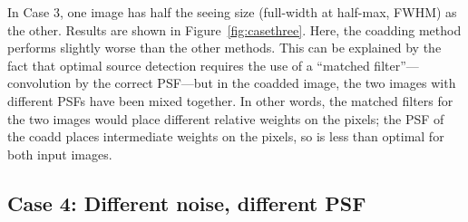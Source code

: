 \documentclass[a4paper,11pt]{article}
\begin{document}
In Case 3, one image has half the seeing size (full-width at half-max,
FWHM) as the other.  Results are shown in Figure~\ref{fig:casethree}.
Here, the coadding method performs slightly worse than the other
methods.  This can be explained by the fact that optimal source
detection requires the use of a ``matched filter''---convolution by
the correct PSF---but in the coadded image, the two images with
different PSFs have been mixed together.  In other words, the matched
filters for the two images would place different relative weights on
the pixels; the PSF of the coadd places intermediate weights on
the pixels, so is less than optimal for both input images.

\newpage

\subsection*{Case 4: Different noise, different PSF}
\end{document}
